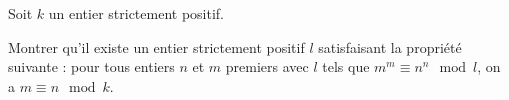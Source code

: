 Soit $k$ un entier strictement positif.

Montrer qu'il existe un entier strictement positif $l$ satisfaisant la propriété suivante : pour tous entiers $n$ et $m$ premiers avec $l$ tels que $m^m\equiv n^n\mod l$, on a $m\equiv n \mod k$.
